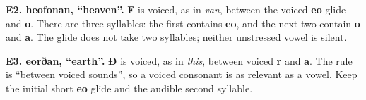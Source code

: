 \textbf{E2. heofonan, “heaven”.} \textbf{F} is voiced, as in \emph{van}, between the voiced \textbf{eo} glide and \textbf{o}. There are three syllables: the first contains \textbf{eo}, and the next two contain \textbf{o} and \textbf{a}. The glide does not take two syllables; neither unstressed vowel is silent.

\textbf{E3. eorðan, “earth”.} \textbf{Ð} is voiced, as in \emph{this}, between voiced \textbf{r} and \textbf{a}. The rule is “between voiced sounds”, so a voiced consonant is as relevant as a vowel. Keep the initial short \textbf{eo} glide and the audible second syllable.


\par\label{end-pronunciation-key}
\clearpage\endgroup
